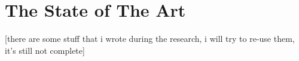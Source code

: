 \chapter{The State of The Art}
\beginchapter
[there are some stuff that i wrote during the research, i will try to re-use them, it's still not complete]